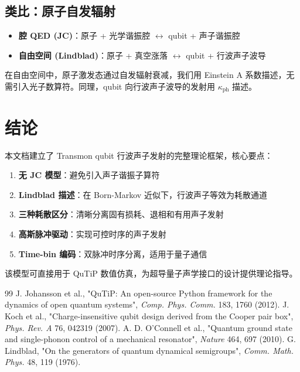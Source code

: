 \documentclass[12pt,a4paper]{article}
\theoremstyle{definition}
\begin{document}
\subsection{类比：原子自发辐射}

\begin{itemize}
    \item \textbf{腔 QED (JC)}：原子 + 光学谐振腔 $\leftrightarrow$ qubit + 声子谐振腔
    \item \textbf{自由空间 (Lindblad)}：原子 + 真空涨落 $\leftrightarrow$ qubit + 行波声子波导
\end{itemize}

在自由空间中，原子激发态通过自发辐射衰减，我们用 Einstein A 系数描述，无需引入光子数算符。同理，qubit 向行波声子波导的发射用 $\kappa_{\text{ph}}$ 描述。

\section{结论}

本文档建立了 Transmon qubit 行波声子发射的完整理论框架，核心要点：

\begin{enumerate}
    \item \textbf{无 JC 模型}：避免引入声子谐振子算符
    \item \textbf{Lindblad 描述}：在 Born-Markov 近似下，行波声子等效为耗散通道
    \item \textbf{三种耗散区分}：清晰分离固有损耗、退相和有用声子发射
    \item \textbf{高斯脉冲驱动}：实现可控时序的声子发射
    \item \textbf{Time-bin 编码}：双脉冲时序分离，适用于量子通信
\end{enumerate}

该模型可直接用于 QuTiP 数值仿真，为超导量子声学接口的设计提供理论指导。

\begin{thebibliography}{99}
 J. Johansson et al., "QuTiP: An open-source Python framework for the dynamics of open quantum systems", \textit{Comp. Phys. Comm.} 183, 1760 (2012).
 J. Koch et al., "Charge-insensitive qubit design derived from the Cooper pair box", \textit{Phys. Rev. A} 76, 042319 (2007).
 A. D. O'Connell et al., "Quantum ground state and single-phonon control of a mechanical resonator", \textit{Nature} 464, 697 (2010).
 G. Lindblad, "On the generators of quantum dynamical semigroups", \textit{Comm. Math. Phys.} 48, 119 (1976).
\end{thebibliography}
\end{document}
